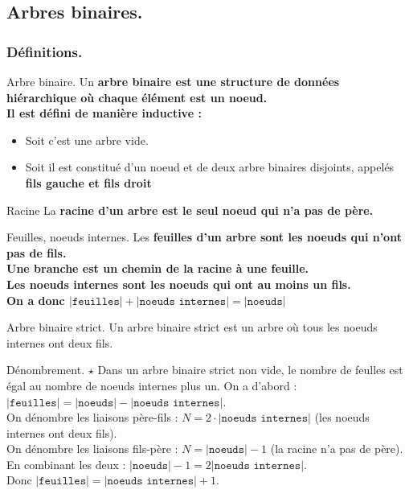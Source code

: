 \documentclass[french, 11pt]{article}
\begin{document}
\subsection{Arbres binaires.}
\subsubsection{Définitions.}

\begin{defi}{Arbre binaire.}{}
    Un \bf{arbre binaire} est une structure de données hiérarchique où chaque élément est un \bf{noeud}.\\
    Il est défini de manière inductive :
    \begin{itemize}[topsep=0pt,itemsep=-0.9 ex]
        \item Soit c'est une arbre vide.
        \item Soit il est constitué d'un noeud et de deux arbre binaires disjoints, appelés \bf{fils gauche} et \bf{fils droit}
    \end{itemize}
\end{defi}

\begin{defi}{Racine}{}
    La \bf{racine} d'un arbre est le seul noeud qui n'a pas de père.
\end{defi}

\begin{defi}{Feuilles, noeuds internes.}{}
    Les \bf{feuilles} d'un arbre sont les noeuds qui n'ont pas de fils.\\
    Une \bf{branche} est un chemin de la racine à une feuille.\\
    Les \bf{noeuds internes} sont les noeuds qui ont au moins un fils.\\
    On a donc $|\texttt{feuilles}| + |\texttt{noeuds internes}| = |\texttt{noeuds}|$
\end{defi}

\begin{defi}{Arbre binaire strict.}{}
    Un arbre binaire strict est un arbre où tous les noeuds internes ont deux fils.
\end{defi}

\begin{prop}{Dénombrement. $\star$}{}
    Dans un arbre binaire strict non vide, le nombre de feulles est égal au nombre de noeuds internes plus un.
    \tcblower
    On a d'abord : $|\texttt{feuilles}|=|\texttt{noeuds}|-|\texttt{noeuds internes}|$.\\
    On dénombre les liaisons père-fils : $N=2\cdot|\texttt{noeuds internes}|$ (les noeuds internes ont deux fils).\\
    On dénombre les liaisons fils-père : $N=|\texttt{noeuds}|-1$ (la racine n'a pas de père).\\
    En combinant les deux : $|\texttt{noeuds}|-1=2|\texttt{noeuds internes}|$.\\
    Donc $|\texttt{feuilles}|=|\texttt{noeuds internes}|+1$.
\end{prop}
\end{document}
